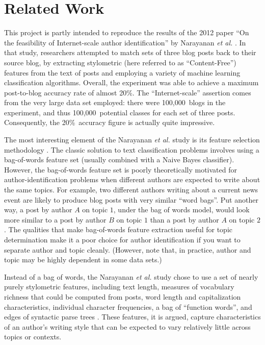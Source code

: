 \documentclass[12pt]{article}
\begin{document}
\section{Related Work}

This project is partly intended to reproduce the results of the 2012 paper ``On the feasibility of Internet-scale author identification'' by Narayanan \textit{et al.} \cite{narayanan2012feasibility}. In that study, researchers attempted to match sets of three blog posts back to their source blog, by extracting stylometric (here referred to as ``Content-Free'') features from the text of posts and employing a variety of machine learning classification algorithms. Overall, the experiment was able to achieve a maximum post-to-blog accuracy rate of almost 20\%. The ``Internet-scale'' assertion comes from the very large data set employed: there were 100,000~blogs in the experiment, and thus 100,000~potential classes for each set of three posts. Consequently, the 20\%~accuracy figure is actually quite impressive.

The most interesting element of the Narayanan \textit{et al.} study is its feature selection methodology \cite{narayanan2012feasibility}. The classic solution to text classification problems involves using a bag-of-words feature set (usually combined with a Naive Bayes classifier). However, the bag-of-words feature set is poorly theoretically motivated for author-identification problems when different authors are expected to write about the same topics. For example, two different authors writing about a current news event are likely to produce blog posts with very similar ``word bags''. Put another way, a post by author $A$ on topic $1$, under the bag of words model, would look more similar to a post by author $B$ on topic $1$ than a post by author $A$ on topic $2$. The qualities that make bag-of-words feature extraction useful for topic determination make it a poor choice for author identification if you want to separate author and topic cleanly. (However, note that, in practice, author and topic may be highly dependent in some data sets.)

Instead of a bag of words, the Narayanan \textit{et al.} study chose to use a set of nearly purely stylometric features, including text length, measures of vocabulary richness that could be computed from posts, word length and capitalization characteristics, individual character frequencies, a bag of ``function words'', and edges of syntactic parse trees \cite{narayanan2012feasibility}. These features, it is argued, capture characteristics of an author's writing style that can be expected to vary relatively little across topics or contexts.
\end{document}
